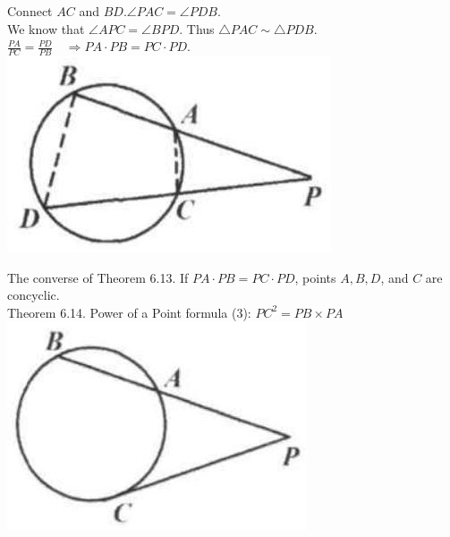 \documentclass[10pt]{article}
\begin{document}
Connect \(A C\) and \(B D . \angle P A C=\angle P D B\).\\
We know that \(\angle A P C=\angle B P D\). Thus \(\triangle P A C \sim \triangle P D B\).\\
\(\frac{P A}{P C}=\frac{P D}{P B} \quad \Rightarrow P A \cdot P B=P C \cdot P D\).\\
\includegraphics[max width=\textwidth, center]{2025_04_17_97bc1f7e44d93c271a88g-192(2)}

The converse of Theorem 6.13.
If \(P A \cdot P B=P C \cdot P D\), points \(A, B, D\), and \(C\) are concyclic.\\
Theorem 6.14. Power of a Point formula (3): \(P C^{2}=P B \times P A\)\\
\includegraphics[max width=\textwidth, center]{2025_04_17_97bc1f7e44d93c271a88g-192(4)}
\end{document}
